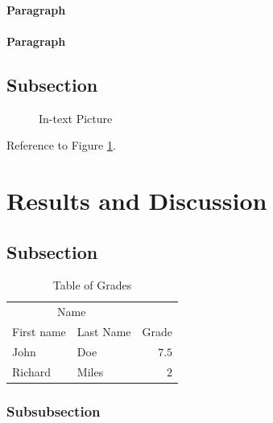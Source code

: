 \documentclass[fleqn,10pt]{SelfArx} %
\begin{document}
\lipsum[6] %

\paragraph{Paragraph} \lipsum[7] %
\paragraph{Paragraph} \lipsum[8] %

\subsection{Subsection}

\lipsum[9] %

\begin{figure}[ht]\centering
\caption{In-text Picture}
\label{fig:results}
\end{figure}

Reference to Figure \ref{fig:results}.


\section{Results and Discussion}

\lipsum[10] %

\subsection{Subsection}

\lipsum[11] %

\begin{table}[hbt]
\caption{Table of Grades}
\centering
\begin{tabular}{llr}
\toprule
\multicolumn{2}{c}{Name} \\
\cmidrule(r){1-2}
First name & Last Name & Grade \\
\midrule
John & Doe & $7.5$ \\
Richard & Miles & $2$ \\
\bottomrule
\end{tabular}
\label{tab:label}
\end{table}

\subsubsection{Subsubsection}
\end{document}
